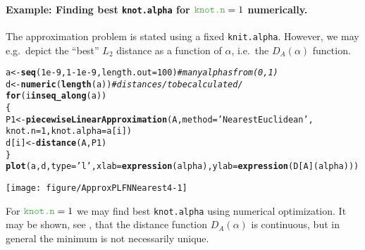 \documentclass[11pt]{article}\usepackage[]{graphicx}\usepackage[]{color}
\makeatletter
\newcommand{\hlnum}[1]{\textcolor[rgb]{0.686,0.059,0.569}{#1}}%
\newcommand{\hlstr}[1]{\textcolor[rgb]{0.192,0.494,0.8}{#1}}%
\newcommand{\hlcom}[1]{\textcolor[rgb]{0.678,0.584,0.686}{\textit{#1}}}%
\newcommand{\hlopt}[1]{\textcolor[rgb]{0,0,0}{#1}}%
\newcommand{\hlstd}[1]{\textcolor[rgb]{0.345,0.345,0.345}{#1}}%
\newcommand{\hlkwa}[1]{\textcolor[rgb]{0.161,0.373,0.58}{\textbf{#1}}}%
\newcommand{\hlkwb}[1]{\textcolor[rgb]{0.69,0.353,0.396}{#1}}%
\newcommand{\hlkwc}[1]{\textcolor[rgb]{0.333,0.667,0.333}{#1}}%
\newcommand{\hlkwd}[1]{\textcolor[rgb]{0.737,0.353,0.396}{\textbf{#1}}}%
\newenvironment{kframe}{%
 \def\at@end@of@kframe{}%
 \ifinner\ifhmode%
  \def\at@end@of@kframe{\end{minipage}}%
  \begin{minipage}{\columnwidth}%
 \fi\fi%
 \def\FrameCommand##1{\hskip\@totalleftmargin \hskip-\fboxsep
 \colorbox{shadecolor}{##1}\hskip-\fboxsep
     \hskip-\linewidth \hskip-\@totalleftmargin \hskip\columnwidth}%
 \MakeFramed {\advance\hsize-\width
   \@totalleftmargin\z@ \linewidth\hsize
   \@setminipage}}%
 {\par\unskip\endMakeFramed%
 \at@end@of@kframe}
\newenvironment{knitrout}{}{} %
\newcommand{\argument}[1]{\texttt{\hlkwc{#1}}}
\makeatother
\begin{document}
\paragraph{Example: Finding best \argument{knot.alpha}
for $\text{\argument{knot.n}}=1$ numerically.}
The approximation problem is stated using a fixed
\argument{knit.alpha}.
However, we may e.g.~depict the ``best'' $L_2$ distance as a function of $\alpha$,
i.e.~the $D_{A}(\alpha)$ function.

\begin{knitrout}\small
{}\color{fgcolor}\begin{kframe}
\begin{alltt}
\hlstd{a} \hlkwb{<-} \hlkwd{seq}\hlstd{(}\hlnum{1e-9}\hlstd{,} \hlnum{1}\hlopt{-}\hlnum{1e-9}\hlstd{,} \hlkwc{length.out}\hlstd{=}\hlnum{100}\hlstd{)} \hlcom{# many alphas from (0,1)}
\hlstd{d} \hlkwb{<-} \hlkwd{numeric}\hlstd{(}\hlkwd{length}\hlstd{(a))} \hlcom{# distances /to be calculated/}
\hlkwa{for} \hlstd{(i} \hlkwa{in} \hlkwd{seq_along}\hlstd{(a))}
\hlstd{\{}
   \hlstd{P1} \hlkwb{<-} \hlkwd{piecewiseLinearApproximation}\hlstd{(A,} \hlkwc{method}\hlstd{=}\hlstr{'NearestEuclidean'}\hlstd{,}
            \hlkwc{knot.n}\hlstd{=}\hlnum{1}\hlstd{,} \hlkwc{knot.alpha}\hlstd{=a[i])}
   \hlstd{d[i]} \hlkwb{<-} \hlkwd{distance}\hlstd{(A, P1)}
\hlstd{\}}
\hlkwd{plot}\hlstd{(a, d,} \hlkwc{type}\hlstd{=}\hlstr{'l'}\hlstd{,} \hlkwc{xlab}\hlstd{=}\hlkwd{expression}\hlstd{(alpha),} \hlkwc{ylab}\hlstd{=}\hlkwd{expression}\hlstd{(D[A](alpha)))}
\end{alltt}
\end{kframe}
\end{knitrout}

\begin{center}
\begin{knitrout}\small
{}\color{fgcolor}

{\centering \texttt{[image: figure/ApproxPLFNNearest4-1]} 

}



\end{knitrout}
\end{center}

For $\text{\argument{knot.n}}=1$ we may find best \argument{knot.alpha} using numerical optimization.
It may be shown, see \cite{CoroianuETAL2013:piecewise1},
that the distance function $D_{A}(\alpha)$ is continuous,
but in general the minimum is not necessarily unique.
\end{document}
